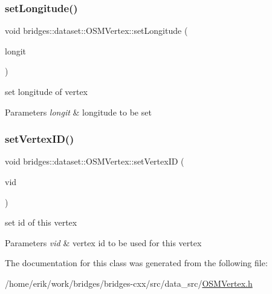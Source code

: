 \subsubsection{\texorpdfstring{set\+Longitude()}{setLongitude()}}
{\footnotesize\ttfamily void bridges\+::dataset\+::\+O\+S\+M\+Vertex\+::set\+Longitude (\begin{DoxyParamCaption}\item[{double}]{longit }\end{DoxyParamCaption})\hspace{0.3cm}{\ttfamily [inline]}}

set longitude of vertex


\begin{DoxyParams}{Parameters}
{\em longit} & longitude to be set \\
\hline
\end{DoxyParams}
\mbox{\label{classbridges_1_1dataset_1_1_o_s_m_vertex_ae16bbcdef938da97f2c665825ecac346}} 
\subsubsection{\texorpdfstring{set\+Vertex\+I\+D()}{setVertexID()}}
{\footnotesize\ttfamily void bridges\+::dataset\+::\+O\+S\+M\+Vertex\+::set\+Vertex\+ID (\begin{DoxyParamCaption}\item[{\hyperlink{classbridges_1_1dataset_1_1_o_s_m_vertex_ad166f13b0aefbdc05a273546f2a3bb96}{O\+S\+M\+Vertex\+ID}}]{vid }\end{DoxyParamCaption})\hspace{0.3cm}{\ttfamily [inline]}}

set id of this vertex 
\begin{DoxyParams}{Parameters}
{\em vid} & vertex id to be used for this vertex \\
\hline
\end{DoxyParams}


The documentation for this class was generated from the following file\+:\begin{DoxyCompactItemize}
\item 
/home/erik/work/bridges/bridges-\/cxx/src/data\+\_\+src/\hyperlink{_o_s_m_vertex_8h}{O\+S\+M\+Vertex.\+h}\end{DoxyCompactItemize}
